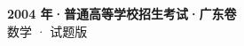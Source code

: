 \documentclass[zihao=-4, a4paper]{ctexart}
\begin{document}
\begin{center}
  {\Large\bfseries 2004 年·普通高等学校招生考试·广东卷}\\[4pt]
  {\large 数学 · 试题版}
\end{center}
\medskip
{}

\end{document}
